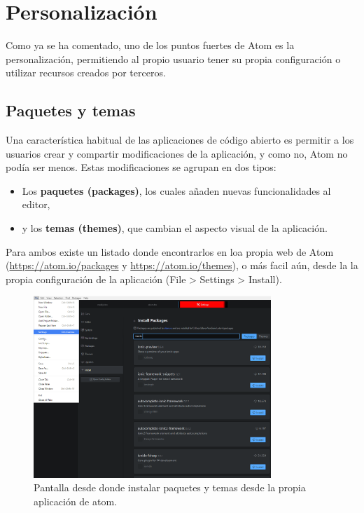\section{Personalización}

Como ya se ha comentado, uno de los puntos fuertes de Atom es la personalización, permitiendo al propio usuario tener su propia configuración o utilizar recursos creados por terceros.

\subsection{Paquetes y temas}

Una característica habitual de las aplicaciones de código abierto es permitir a los usuarios crear y compartir modificaciones de la aplicación, y como no, Atom no podía ser menos. Estas modificaciones se agrupan en dos tipos:

\begin{itemize}
  \item Los \textbf{paquetes (packages)}, los cuales añaden nuevas funcionalidades al editor,
  \item y los \textbf{temas (themes)}, que cambian el aspecto visual de la aplicación.
\end{itemize}

Para ambos existe un listado donde encontrarlos en loa propia web de Atom (\url{https://atom.io/packages} y \url{https://atom.io/themes}), o más facil aún, desde la la propia configuración de la aplicación (File > Settings > Install).

\begin{figure}[H]
\centering
  \includegraphics[width=0.8\textwidth]{Figures/anexo/anexoI/atom/install_packages_and_themes}
  \caption{Pantalla desde donde instalar paquetes y temas desde la propia aplicación de atom.}
\end{figure}
